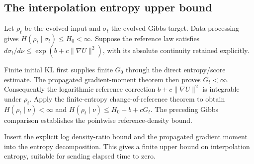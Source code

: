 \documentclass[11pt,a4paper]{report}
\begin{document}
\subsection{\texorpdfstring{The interpolation entropy upper bound}{The interpolation entropy upper bound}}
\label{report-step-UnadjustedLangevin-LSI-EntropyEndpoint-lean-8}


Let \(\rho_t\) be the evolved input and \(\sigma_t\) the evolved Gibbs target. Data processing gives \(H(\rho_t\mid\sigma_t)\le H_0<\infty\). Suppose the reference law satisfies \(d\sigma_t/d\nu\le\exp(b+c\|\nabla U\|^2)\), with its absolute continuity retained explicitly.



Finite initial KL first supplies finite \(G_0\) through the direct entropy/\allowbreak{}score estimate. The propagated gradient-moment theorem then proves \(G_t<\infty\). Consequently the logarithmic reference correction \(b+c\|\nabla U\|^2\) is integrable under \(\rho_t\). Apply the finite-entropy change-of-reference theorem to obtain \(H(\rho_t\mid\nu)<\infty\) and \(H(\rho_t\mid\nu)\le H_0+b+cG_t\). The preceding Gibbs comparison establishes the pointwise reference-density bound.



Insert the explicit log density-ratio bound and the propagated gradient moment into the entropy decomposition. This gives a finite upper bound on interpolation entropy, suitable for sending elapsed time to zero.
\end{document}
